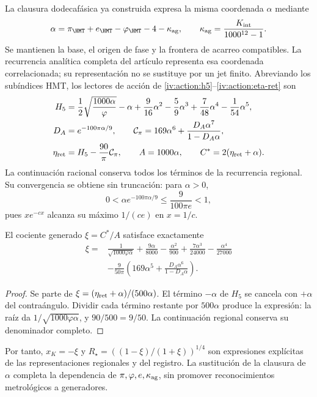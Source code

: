 La clausura dodecafásica ya construida expresa la misma coordenada \(\alpha\) mediante
\[
 \alpha=\pi_{\HMT}+e_{\HMT}-\varphi_{\HMT}-4-\kappa_{\rm ag},
 \qquad \kappa_{\rm ag}=\frac{K_{\rm int}}{1000^{12}-1}.
\]
Se mantienen la base, el origen de fase y la frontera de acarreo compatibles. La recurrencia analítica completa del artículo representa esa coordenada correlacionada; su representación no se sustituye por un jet finito. Abreviando los subíndices HMT, los lectores de acción de \eqref{iv:action:h5}--\eqref{iv:action:eta-ret} son
\begin{align}
 H_5&=\frac12\sqrt{\frac{1000\alpha}{\varphi}}-\alpha
       +\frac9{16}\alpha^2-\frac59\alpha^3
       +\frac7{48}\alpha^4-\frac1{54}\alpha^5,\nonumber\\
 D_A&=e^{-100\pi\alpha/9},\qquad
 \mathcal C_\pi=169\alpha^6+\frac{D_A\alpha^7}{1-D_A\alpha},\nonumber\\
 \eta_{\rm ret}&=H_5-\frac{90}{\pi}\mathcal C_\pi,
 \qquad A=1000\alpha,\qquad C^*=2(\eta_{\rm ret}+\alpha).
 \label{rec:eq:lectores-completos}
\end{align}
La continuación racional conserva todos los términos de la recurrencia regional. Su convergencia se obtiene sin truncación: para \(\alpha>0\),
\[
 0<\alpha e^{-100\pi\alpha/9}\le\frac9{100\pi e}<1,
\]
pues \(xe^{-cx}\) alcanza su máximo \(1/(ce)\) en \(x=1/c\).

\begin{proposition}
\label{rec:prop:sustitucion}
El cociente generado \(\xi=C^*/A\) satisface exactamente
\begin{align}
 \xi={}&\frac1{\sqrt{1000\varphi\alpha}}
 +\frac{9\alpha}{8000}-\frac{\alpha^2}{900}
 +\frac{7\alpha^3}{24000}-\frac{\alpha^4}{27000}\nonumber\\
 &-\frac9{50\pi}
 \left(169\alpha^5+\frac{D_A\alpha^6}{1-D_A\alpha}\right).
 \label{rec:eq:xi-completa}
\end{align}
\end{proposition}
\begin{proof}
Se parte de \(\xi=(\eta_{\rm ret}+\alpha)/(500\alpha)\). El término \(-\alpha\) de \(H_5\) se cancela con \(+\alpha\) del contraángulo. Dividir cada término restante por \(500\alpha\) produce la expresión: la raíz da \(1/\sqrt{1000\varphi\alpha}\), y \(90/500=9/50\). La continuación regional conserva su denominador completo.
\end{proof}

Por tanto, \(x_K=-\xi\) y \(R_\star=((1-\xi)/(1+\xi))^{1/4}\) son expresiones explícitas de las representaciones regionales y del registro. La sustitución de la clausura de \(\alpha\) completa la dependencia de \(\pi,\varphi,e,\kappa_{\rm ag}\), sin promover reconocimientos metrológicos a generadores.

